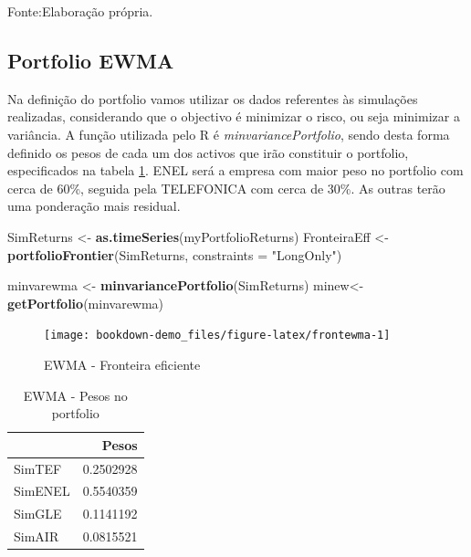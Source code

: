 \documentclass[
  12pt,
  a4paper,
  openany]{book}
\newenvironment{Shaded}{\begin{snugshade}}{\end{snugshade}}
\newcommand{\DataTypeTok}[1]{\textcolor[rgb]{0.13,0.29,0.53}{#1}}
\newcommand{\KeywordTok}[1]{\textcolor[rgb]{0.13,0.29,0.53}{\textbf{#1}}}
\newcommand{\NormalTok}[1]{#1}
\newcommand{\StringTok}[1]{\textcolor[rgb]{0.31,0.60,0.02}{#1}}
\begin{document}
Fonte:Elaboração própria.

\justifying
\bigskip

\hypertarget{portfolio-ewma}{%
\subsection{Portfolio EWMA}\label{portfolio-ewma}}

Na definição do portfolio vamos utilizar os dados referentes às simulações realizadas, considerando que o objectivo é minimizar o risco, ou seja minimizar a variância. A função utilizada pelo R é \emph{minvariancePortfolio}, sendo desta forma definido os pesos de cada um dos activos que irão constituir o portfolio, especificados na tabela \ref{tab:pewma}. ENEL será a empresa com maior peso no portfolio com cerca de 60\%, seguida pela TELEFONICA com cerca de 30\%. As outras terão uma ponderação mais residual.

\scriptsize

\begin{Shaded}
\begin{Highlighting}[]
\NormalTok{SimReturns \textless{}{-}}\StringTok{ }\KeywordTok{as.timeSeries}\NormalTok{(myPortfolioReturns)}
\NormalTok{FronteiraEff \textless{}{-}}\StringTok{ }\KeywordTok{portfolioFrontier}\NormalTok{(SimReturns, }\DataTypeTok{constraints =} \StringTok{"LongOnly"}\NormalTok{)}

\NormalTok{minvarewma \textless{}{-}}\StringTok{ }\KeywordTok{minvariancePortfolio}\NormalTok{(SimReturns) }
\NormalTok{minew\textless{}{-}}\KeywordTok{getPortfolio}\NormalTok{(minvarewma)}
\end{Highlighting}
\end{Shaded}

\normalsize

\begin{figure}

{\centering \texttt{[image: bookdown-demo\_files/figure-latex/frontewma-1]} 

}

\caption{EWMA - Fronteira eficiente}\label{fig:frontewma}
\end{figure}

\begin{table}[!h]

\caption{\label{tab:pewma}EWMA - Pesos no portfolio}
\centering
\begin{tabular}[t]{lr}
\toprule
  & Pesos\\
\midrule
SimTEF & 0.2502928\\
SimENEL & 0.5540359\\
SimGLE & 0.1141192\\
SimAIR & 0.0815521\\
\bottomrule
\end{tabular}
\end{table}
\end{document}
